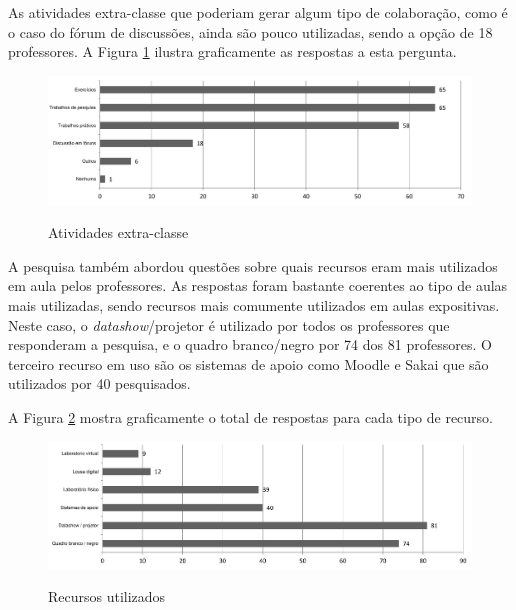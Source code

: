 As atividades extra-classe que poderiam gerar algum tipo de colaboração, como é o caso do fórum de discussões, ainda são pouco utilizadas, sendo a opção de 18 professores. A Figura \ref{fig:grafico_atividades_extra_classe} ilustra graficamente as respostas a esta pergunta.

 
\begin{figure}[!h]
\centering
\caption{Atividades extra-classe}
\includegraphics[width=1.0\textwidth]{pdfs/professores/img-grafico-extra-classe.pdf} 
\label{fig:grafico_atividades_extra_classe} 
\end{figure}



A pesquisa também abordou questões sobre quais recursos eram mais utilizados em aula pelos professores. As respostas foram bastante coerentes ao tipo de aulas mais utilizadas, sendo recursos mais comumente utilizados em aulas expositivas. Neste caso, o \emph{datashow}/projetor é utilizado por todos os professores que responderam a pesquisa, e o quadro branco/negro por 74 dos 81 professores. O terceiro recurso em uso são os sistemas de apoio como Moodle e Sakai que são utilizados por 40 pesquisados.

A Figura \ref{fig:grafico_recursos} mostra graficamente o total de respostas para cada tipo de recurso.
 
\begin{figure}[!h]
\centering
\caption{Recursos utilizados}
\includegraphics[width=1.0\textwidth]{pdfs/professores/img-grafico-recursos.pdf} 
\label{fig:grafico_recursos} 
\end{figure}

